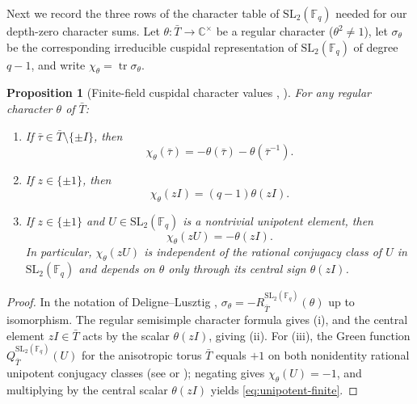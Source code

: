 \documentclass[12pt, letterpaper]{article}
\numberwithin{equation}{section}
\newtheorem{proposition}[theorem]{Proposition}
\theoremstyle{definition}
\theoremstyle{remark}
\newcommand{\kk}{\mathbb{F}_q}
\newcommand{\Gbar}{\mathrm{SL}_2(\kk)}
\newcommand{\tr}{\operatorname{tr}}
\begin{document}
Next we record the three rows of the character table of $\Gbar$ needed for our depth-zero character sums. Let $\theta:\bar{T}\to\mathbb{C}^\times$ be a regular character ($\theta^2\ne 1$), let $\sigma_\theta$ be the corresponding irreducible cuspidal representation of $\Gbar$ of degree $q-1$, and write $\chi_\theta=\tr\sigma_\theta$.

\begin{proposition}[Finite-field cuspidal character values {\cite[Table~5.4]{Bo11}, \cite[\S 15.9]{DM20}}]\label{prop:finite}
For any regular character $\theta$ of $\bar{T}$:
\begin{enumerate}[label=(\roman*)]
 \item If $\bar{\tau}\in\bar{T}\setminus\{\pm I\}$, then
 \begin{equation}\label{eq:elliptic-finite}
  \chi_\theta(\bar{\tau})=-\theta(\bar{\tau})-\theta(\bar{\tau}^{-1}).
 \end{equation}
 \item If $z\in\{\pm 1\}$, then
 \begin{equation}\label{eq:central-finite}
  \chi_\theta(zI)=(q-1)\theta(zI).
 \end{equation}
 \item If $z\in\{\pm 1\}$ and $U\in\Gbar$ is a nontrivial unipotent element, then
 \begin{equation}\label{eq:unipotent-finite}
  \chi_\theta(zU)=-\theta(zI).
 \end{equation}
 In particular, $\chi_\theta(zU)$ is independent of the rational conjugacy class of $U$ in $\Gbar$ and depends on $\theta$ only through its central sign $\theta(zI)$.
\end{enumerate}
\end{proposition}
\begin{proof}
In the notation of Deligne--Lusztig \cite{DL76}, $\sigma_\theta=-R_{\bar{T}}^{\Gbar}(\theta)$ up to isomorphism. The regular semisimple character formula gives (i), and the central element $zI\in\bar{T}$ acts by the scalar $\theta(zI)$, giving (ii). For (iii), the Green function $Q_{\bar{T}}^{\Gbar}(U)$ for the anisotropic torus $\bar{T}$ equals $+1$ on both nonidentity rational unipotent conjugacy classes (see \cite[Table~5.4]{Bo11} or \cite[\S 2.3, Eq.~(2-6)]{CG09}); negating gives $\chi_\theta(U)=-1$, and multiplying by the central scalar $\theta(zI)$ yields \eqref{eq:unipotent-finite}.
\end{proof}
\end{document}
